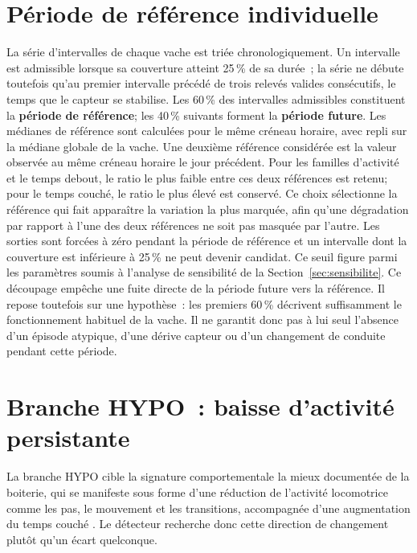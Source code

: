 \section{Période de référence individuelle}
La série d'intervalles de chaque vache est triée chronologiquement. Un intervalle est
admissible lorsque sa couverture atteint 25\,\% de sa durée~; la série ne débute toutefois
qu'au premier intervalle précédé de trois relevés valides consécutifs, le temps que le capteur
se stabilise. Les 60\,\% des intervalles admissibles
constituent la \textbf{période de référence}; les 40\,\% suivants forment la
\textbf{période future}. Les médianes de
référence sont calculées pour le même créneau horaire, avec repli sur la médiane globale de
la vache. Une deuxième référence considérée est la valeur observée au même créneau horaire le
jour précédent. Pour les familles
d'activité et le temps debout, le ratio le plus faible entre ces deux références est retenu;
pour le temps couché, le ratio le plus élevé est conservé. Ce choix sélectionne la référence
qui fait apparaître la variation la plus marquée, afin qu'une dégradation par rapport
à l'une des deux références ne soit pas masquée par l'autre. Les sorties sont forcées
à zéro pendant la période de référence et un intervalle dont la couverture est inférieure à 25\,\% ne
peut devenir candidat. Ce seuil figure parmi les paramètres soumis à l'analyse de
sensibilité de la Section~\ref{sec:sensibilite}. Ce découpage empêche une fuite directe de la période future vers la
référence. Il repose toutefois sur une hypothèse~: les premiers 60\,\% décrivent
suffisamment le fonctionnement habituel de la vache. Il ne garantit donc pas à lui seul
l'absence d'un épisode atypique, d'une dérive capteur ou d'un changement de conduite pendant
cette période.

\section{Branche HYPO~: baisse d'activité persistante}
\label{sec:hypo}
La branche HYPO cible la signature comportementale la mieux documentée de la boiterie, qui se
manifeste sous forme d'une réduction de l'activité locomotrice comme les pas, le mouvement et
les transitions, accompagnée d'une
augmentation du temps couché \citep{ito2010lying,blackie2011lying,chapinal2010measurement}.
Le détecteur recherche donc cette direction de changement plutôt qu'un écart quelconque.

